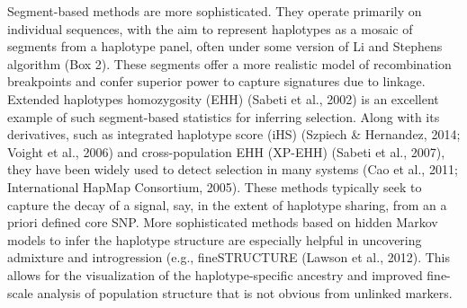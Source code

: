 \documentclass[twocolumn]{bmcart}%
\begin{document}
\begin{strip}
\begin{tcolorbox}[colback=blue!5!white,colframe=blue!50!black,title= Box 2: Population genetic methods that make use of haplotype information]
{Segment-based methods are more sophisticated. They operate primarily on individual sequences, with the aim to represent haplotypes as a mosaic of segments from a haplotype panel, often under some version of Li and Stephens algorithm (Box 2). These segments offer a more realistic model of recombination breakpoints and confer superior power to capture signatures due to linkage. Extended haplotypes homozygosity (EHH) (Sabeti et al., 2002) is an excellent example of such segment-based statistics for inferring selection. Along with its derivatives, such as integrated haplotype score (iHS) (Szpiech \& Hernandez, 2014; Voight et al., 2006) and cross-population EHH (XP-EHH) (Sabeti et al., 2007), they have been widely used to detect selection in many systems (Cao et al., 2011; International HapMap Consortium, 2005). These methods typically seek to capture the decay of a signal, say, in the extent of haplotype sharing, from an a priori defined core SNP. More sophisticated methods based on hidden Markov models to infer the haplotype structure are especially helpful in uncovering admixture and introgression (e.g., fineSTRUCTURE (Lawson et al., 2012). This allows for the visualization of the haplotype-specific ancestry and improved fine-scale analysis of population structure that is not obvious from unlinked markers. }
\end{tcolorbox}
\end{strip}
\end{document}
